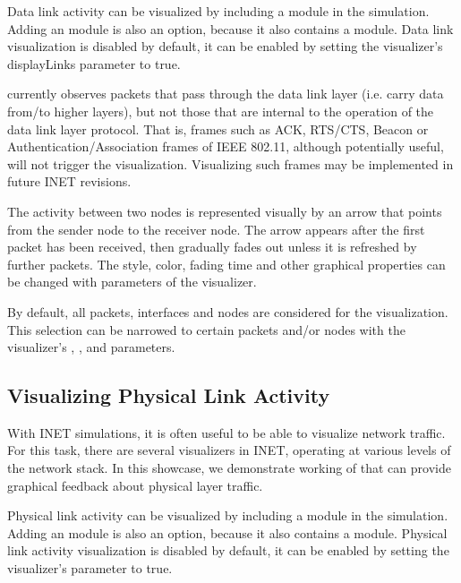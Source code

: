 Data link activity can be visualized by including a  module in
the simulation. Adding an  module is also an option, because
it also contains a  module. Data link visualization is
disabled by default, it can be enabled by setting the visualizer's displayLinks
parameter to true.

 currently observes packets that pass through the data link
layer (i.e. carry data from/to higher layers), but not those that are internal
to the operation of the data link layer protocol. That is, frames such as ACK,
RTS/CTS, Beacon or Authentication/Association frames of IEEE 802.11, although
potentially useful, will not trigger the visualization. Visualizing such frames
may be implemented in future INET revisions.

The activity between two nodes is represented visually by an arrow that points
from the sender node to the receiver node. The arrow appears after the first
packet has been received, then gradually fades out unless it is refreshed by
further packets. The style, color, fading time and other graphical properties
can be changed with parameters of the visualizer.

By default, all packets, interfaces and nodes are considered for the
visualization. This selection can be narrowed to certain packets and/or nodes
with the visualizer's , , and
 parameters.


\subsection{Visualizing Physical Link Activity}
\label{sec:visualization:physical-link-activity}

With INET simulations, it is often useful to be able to visualize network
traffic. For this task, there are several visualizers in INET, operating at
various levels of the network stack. In this showcase, we demonstrate working of
 that can provide graphical feedback about physical layer
traffic.

Physical link activity can be visualized by including a 
module in the simulation. Adding an  module is also an
option, because it also contains a  module. Physical link
activity visualization is disabled by default, it can be enabled by setting the
visualizer's  parameter to true.

